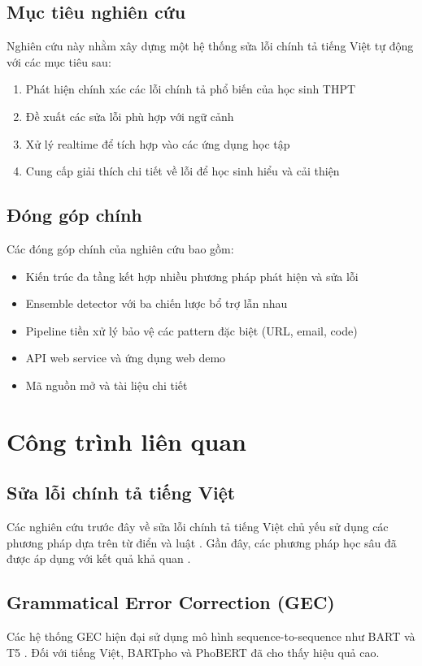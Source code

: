 \documentclass[conference]{IEEEtran}
\begin{document}
\subsection{Mục tiêu nghiên cứu}
Nghiên cứu này nhằm xây dựng một hệ thống sửa lỗi chính tả tiếng Việt tự động với các mục tiêu sau:
\begin{enumerate}
    \item Phát hiện chính xác các lỗi chính tả phổ biến của học sinh THPT
    \item Đề xuất các sửa lỗi phù hợp với ngữ cảnh
    \item Xử lý realtime để tích hợp vào các ứng dụng học tập
    \item Cung cấp giải thích chi tiết về lỗi để học sinh hiểu và cải thiện
\end{enumerate}

\subsection{Đóng góp chính}
Các đóng góp chính của nghiên cứu bao gồm:
\begin{itemize}
    \item Kiến trúc đa tầng kết hợp nhiều phương pháp phát hiện và sửa lỗi
    \item Ensemble detector với ba chiến lược bổ trợ lẫn nhau
    \item Pipeline tiền xử lý bảo vệ các pattern đặc biệt (URL, email, code)
    \item API web service và ứng dụng web demo
    \item Mã nguồn mở và tài liệu chi tiết
\end{itemize}

\section{Công trình liên quan}

\subsection{Sửa lỗi chính tả tiếng Việt}
Các nghiên cứu trước đây về sửa lỗi chính tả tiếng Việt chủ yếu sử dụng các phương pháp dựa trên từ điển và luật \cite{nguyen2018vietnamese}. Gần đây, các phương pháp học sâu đã được áp dụng với kết quả khả quan \cite{tran2021deep}.

\subsection{Grammatical Error Correction (GEC)}
Các hệ thống GEC hiện đại sử dụng mô hình sequence-to-sequence như BART \cite{lewis2020bart} và T5 \cite{raffel2020t5}. Đối với tiếng Việt, BARTpho \cite{nguyen2022bartpho} và PhoBERT \cite{nguyen2020phobert} đã cho thấy hiệu quả cao.
\end{document}
